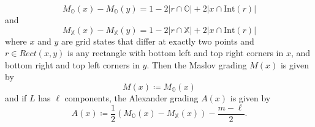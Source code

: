 \documentclass[11pt]{amsart}
\theoremstyle{definition}
\theoremstyle{remark}
\numberwithin{equation}{section}
\begin{document}
\begin{equation}\label{relativeOMaslov}
M_{\mathbb{O}}(x)-M_{\mathbb{O}}(y)=1-2|r\cap \mathbb{O}|+2|x\cap \textrm{Int}(r)|
\end{equation}
and
\begin{equation}\label{relativeXMaslov}
M_{\mathbb{X}}(x)-M_{\mathbb{X}}(y)=1-2|r\cap \mathbb{X}|+2|x\cap \textrm{Int}(r)|
\end{equation}
where $x$ and $y$ are grid states that differ at exactly two points and $r\in Rect(x,y)$ is any rectangle with bottom left and top right corners in $x$, and bottom right and top left corners in $y.$ Then the Maslov grading $M(x)$ is given by \begin{equation}\label{Maslovgrid}M(x)\coloneq M_{\mathbb{O}}(x)\end{equation} and if $L$ has $\ell$ components, the Alexander grading $A(x)$ is given by \begin{equation}\label{Alexandergrid}A(x)\coloneq \frac{1}{2}(M_{\mathbb{O}}(x)-M_{\mathbb{X}}(x))-\frac{m-\ell}{2}.\end{equation} 
\end{document}
